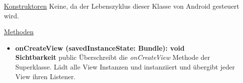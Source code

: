 \underline{Konstruktoren}\newline
\indent Keine, da der Lebenszyklus dieser Klasse von Android gesteuert wird.\newline

\underline{Methoden}
\begin{itemize}
\itemsep0pt
\item \textbf{onCreateView (savedInstanceState: Bundle): void}\hfill\\
\textbf{Sichtbarkeit} public\newline
Überschreibt die \textit{onCreateView} Methode der Superklasse. Lädt alle View Instanzen und instanziiert und übergibt jeder View ihren Listener.

\end{itemize}